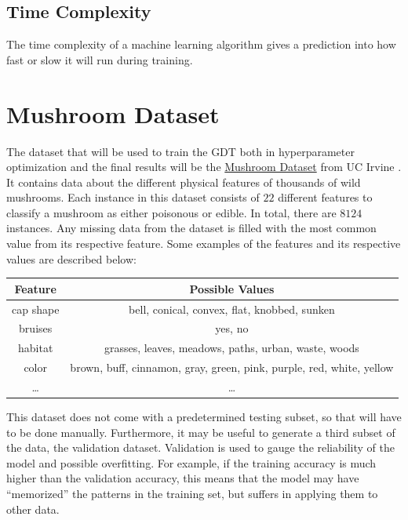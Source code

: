 \documentclass[12pt]{article}
\begin{document}
\subsection{Time Complexity}

The time complexity of a machine learning algorithm gives a prediction into how fast or slow it will run during training.

\section{Mushroom Dataset}

The dataset that will be used to train the GDT both in hyperparameter optimization and the final results will be the \href{https://archive-beta.ics.uci.edu/ml/datasets/mushroom}{Mushroom Dataset} from UC Irvine \cite{misc_mushroom_73}. It contains data about the different physical features of thousands of wild mushrooms. Each instance in this dataset consists of $22$ different features to classify a mushroom as either poisonous or edible. In total, there are $8124$ instances. Any missing data from the dataset is filled with the most common value from its respective feature. Some examples of the features and its respective values are described below:

\begin{center}
    \begin{tabular}{|c|c|}
        \hline
        Feature & Possible Values \\
        \hline \hline
        cap shape & bell, conical, convex, flat, knobbed, sunken \\
        \hline
        bruises & yes, no \\
        \hline
        habitat & grasses, leaves, meadows, paths, urban, waste, woods \\
        \hline
        color & brown, buff, cinnamon, gray, green, pink, purple, red, white, yellow \\
        \hline
        \dots & \dots \\
        \hline
    \end{tabular}
\end{center}

This dataset does not come with a predetermined testing subset, so that will have to be done manually. Furthermore, it may be useful to generate a third subset of the data, the validation dataset. Validation is used to gauge the reliability of the model and possible overfitting. For example, if the training accuracy is much higher than the validation accuracy, this means that the model may have ``memorized'' the patterns in the training set, but suffers in applying them to other data.
\end{document}
